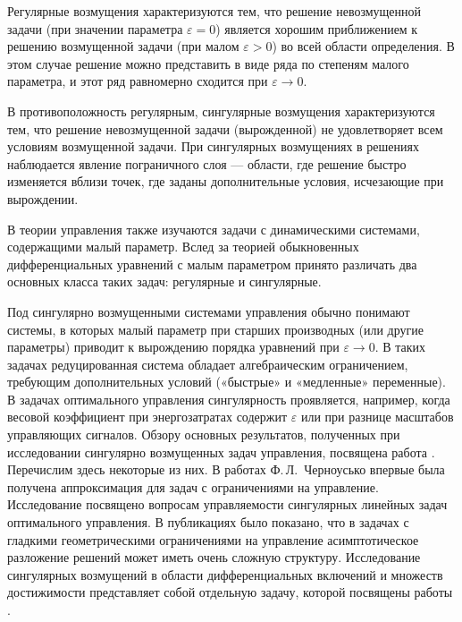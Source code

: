 \documentclass[../main.tex]{subfiles}
\begin{document}
Регулярные возмущения характеризуются тем, что решение невозмущенной задачи (при значении параметра $\varepsilon = 0$) является хорошим приближением к решению возмущенной задачи (при малом $\varepsilon > 0$) во всей области определения. 
В этом случае решение можно представить в виде ряда по степеням малого параметра, и этот ряд равномерно сходится при $\varepsilon \to 0$.

В противоположность регулярным, сингулярные возмущения характеризуются тем, что решение невозмущенной задачи (вырожденной) не удовлетворяет всем условиям возмущенной задачи. 
При сингулярных возмущениях в решениях наблюдается явление пограничного слоя --- области, где решение быстро изменяется вблизи точек, где заданы дополнительные условия, исчезающие при вырождении.

В теории управления также изучаются задачи с динамическими системами, содержащими малый параметр. 
Вслед за теорией обыкновенных дифференциальных уравнений с малым параметром принято различать два основных класса таких задач: регулярные и сингулярные. 

Под сингулярно возмущенными системами управления обычно понимают системы, в которых малый параметр при старших производных (или другие параметры) приводит к вырождению порядка уравнений при $\varepsilon\to0$. 
В таких задачах редуцированная система обладает алгебраическим ограничением, требующим дополнительных условий («быстрые» и «медленные» переменные). 
В задачах оптимального управления сингулярность проявляется, например, когда весовой коэффициент при энергозатратах содержит $\varepsilon$ или при разнице масштабов управляющих сигналов. 
Обзору основных результатов, полученных при исследовании сингулярно возмущенных задач управления, посвящена работа \cite{Dmitriev}.
Перечислим здесь некоторые из них. 
В работах Ф.\,Л.~Черноусько \cite{Chernousko1968, Chernousko1977} впервые была получена аппроксимация для задач с ограничениями на управление.
Исследование \cite{Kokotovic} посвящено вопросам управляемости сингулярных линейных задач оптимального управления.
В публикациях \cite{Ilyin1989, Ilyin1998} было показано, что в задачах с гладкими геометрическими ограничениями на управление асимптотическое разложение решений может иметь очень сложную структуру. 
Исследование сингулярных возмущений в области дифференциальных включений и множеств достижимости представляет собой отдельную задачу, которой посвящены работы \cite{FilippovaKurzhansky, Veliov, GONCHAROVAOVSEEVICH}.
\end{document}
